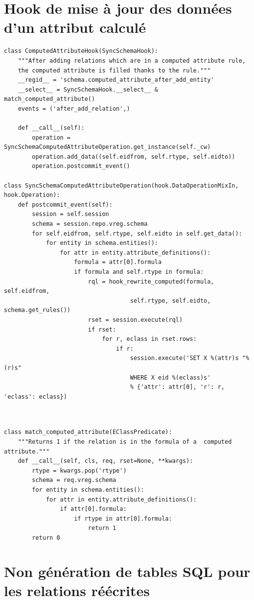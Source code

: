 \documentclass {report}
\begin{document}
\section{Hook de mise à jour des données d'un attribut calculé}
\renewcommand{\lstlistingname}{Hook}
\begin{lstlisting}[caption= Mise à jour des données d'un attribut calculé]
class ComputedAttributeHook(SyncSchemaHook):
	"""After adding relations which are in a computed attribute rule,
	the computed attribute is filled thanks to the rule."""
	__regid__ = 'schema.computed_attribute_after_add_entity'
	__select__ = SyncSchemaHook.__select__ & match_computed_attribute()
	events = ('after_add_relation',)

	def __call__(self):
		operation = SyncSchemaComputedAttributeOperation.get_instance(self._cw)
		operation.add_data((self.eidfrom, self.rtype, self.eidto))
		operation.postcommit_event()

class SyncSchemaComputedAttributeOperation(hook.DataOperationMixIn, hook.Operation):
	def postcommit_event(self):
		session = self.session
		schema = session.repo.vreg.schema
		for self.eidfrom, self.rtype, self.eidto in self.get_data():
			for entity in schema.entities():
				for attr in entity.attribute_definitions():
					formula = attr[0].formula
					if formula and self.rtype in formula:
						rql = hook_rewrite_computed(formula, self.eidfrom, 
									self.rtype, self.eidto, schema.get_rules())
						rset = session.execute(rql)
						if rset:
							for r, eclass in rset.rows:
								if r:
									session.execute('SET X %(attr)s "%(r)s" 
									WHERE X eid %(eclass)s'
									% {'attr': attr[0], 'r': r, 'eclass': eclass})
																	
		
\end{lstlisting}

\begin{lstlisting}[caption= Sélecteur]
class match_computed_attribute(EClassPredicate):
	"""Returns 1 if the relation is in the formula of a  computed attribute."""
	def __call__(self, cls, req, rset=None, **kwargs):
		rtype = kwargs.pop('rtype')
		schema = req.vreg.schema
		for entity in schema.entities():
			for attr in entity.attribute_definitions():
				if attr[0].formula:
					if rtype in attr[0].formula:
						return 1           
		return 0
\end{lstlisting}

\section{Non génération de tables SQL pour les relations réécrites}
\end{document}
